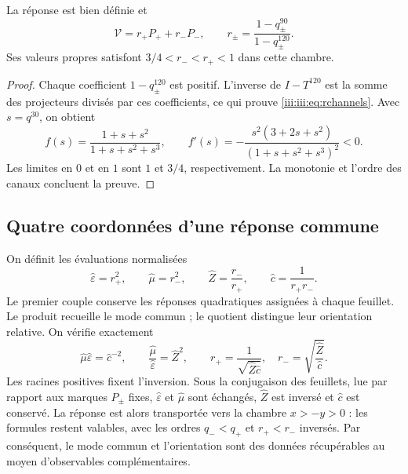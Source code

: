 \begin{proposition}
La réponse est bien définie et
\begin{equation}
 \mathcal V=r_+P_++r_-P_-,\qquad
 r_\pm=\frac{1-q_\pm^{90}}{1-q_\pm^{120}}.
 \label{iii:iii:eq:rchannels}
\end{equation}
Ses valeurs propres satisfont $3/4<r_-<r_+<1$ dans cette chambre.
\end{proposition}
\begin{proof}
Chaque coefficient $1-q_\pm^{120}$ est positif. L'inverse de $I-T^{120}$ est la somme des projecteurs divisés par ces coefficients, ce qui prouve \eqref{iii:iii:eq:rchannels}. Avec $s=q^{30}$, on obtient
\begin{equation}
 f(s)=\frac{1+s+s^2}{1+s+s^2+s^3},\qquad
 f'(s)=-\frac{s^2(3+2s+s^2)}{(1+s+s^2+s^3)^2}<0.
 \label{iii:iii:eq:monotone}
\end{equation}
Les limites en $0$ et en $1$ sont $1$ et $3/4$, respectivement. La monotonie
et l’ordre des canaux concluent la preuve.
\end{proof}

\subsection{Quatre coordonnées d’une réponse commune}

On définit les évaluations normalisées
\begin{equation}
 \widehat\varepsilon=r_+^2,\qquad
 \widehat\mu=r_-^2,\qquad
 \widehat Z=\frac{r_-}{r_+},\qquad
 \widehat c=\frac1{r_+r_-}.
 \label{iii:iii:eq:four}
\end{equation}
Le premier couple conserve les réponses quadratiques assignées à chaque feuillet.
Le produit recueille le mode commun ; le quotient distingue leur orientation relative.
On vérifie exactement
\begin{equation}
 \widehat\mu\widehat\varepsilon=\widehat c^{-2},\qquad
 \frac{\widehat\mu}{\widehat\varepsilon}=\widehat Z^2,
 \qquad
 r_+=\frac1{\sqrt{\widehat Z\widehat c}},\quad
 r_-=\sqrt{\frac{\widehat Z}{\widehat c}}.
 \label{iii:iii:eq:four-identities}
\end{equation}
Les racines positives fixent l'inversion. Sous la conjugaison des feuillets, lue par rapport aux marques $P_\pm$ fixes, $\widehat\varepsilon$ et $\widehat\mu$ sont échangés, $\widehat Z$ est inversé et $\widehat c$ est conservé. La réponse est alors transportée vers la chambre $x>-y>0$ : les formules restent valables, avec les ordres $q_-<q_+$ et $r_+<r_-$ inversés. Par conséquent, le mode commun et l'orientation sont des données récupérables au moyen d'observables complémentaires.

